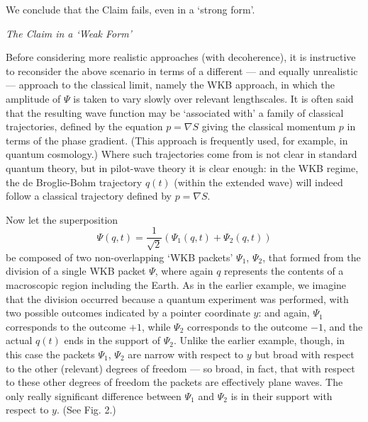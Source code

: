\documentclass[12pt]{article}%
\begin{document}
We conclude that the Claim fails, even in a `strong form'.

\begin{center}
\textit{The Claim in a `Weak Form'}
\end{center}

Before considering more realistic approaches (with decoherence), it is
instructive to reconsider the above scenario in terms of a different --- and
equally unrealistic --- approach to the classical limit, namely the WKB
approach, in which the amplitude of $\Psi$ is taken to vary slowly over
relevant lengthscales. It is often said that the resulting wave function may
be `associated with' a family of classical trajectories, defined by the
equation $p=\nabla S$ giving the classical momentum $p$ in terms of the phase
gradient. (This approach is frequently used, for example, in quantum
cosmology.) Where such trajectories come from is not clear in standard quantum
theory, but in pilot-wave theory it is clear enough: in the WKB regime, the de
Broglie-Bohm trajectory $q(t)$ (within the extended wave) will indeed follow a
classical trajectory defined by $p=\nabla S$.

Now let the superposition%
\[
\Psi(q,t)=\frac{1}{\sqrt{2}}\left(  \Psi_{1}(q,t)+\Psi_{2}(q,t)\right)
\]
be composed of two non-overlapping `WKB packets' $\Psi_{1}$, $\Psi_{2}$, that
formed from the division of a single WKB packet $\Psi$, where again $q$
represents the contents of a macroscopic region including the Earth. As in the
earlier example, we imagine that the division occurred because a quantum
experiment was performed, with two possible outcomes indicated by a pointer
coordinate $y$: and again, $\Psi_{1}$ corresponds to the outcome $+1$, while
$\Psi_{2}$ corresponds to the outcome $-1$, and the actual $q(t)$ ends in the
support of $\Psi_{2}$. Unlike the earlier example, though, in this case the
packets $\Psi_{1}$, $\Psi_{2}$ are narrow with respect to $y$ but broad with
respect to the other (relevant) degrees of freedom --- so broad, in fact, that
with respect to these other degrees of freedom the packets are effectively
plane waves. The only really significant difference between $\Psi_{1}$ and
$\Psi_{2}$ is in their support with respect to $y$. (See Fig. 2.)%
\end{document}
